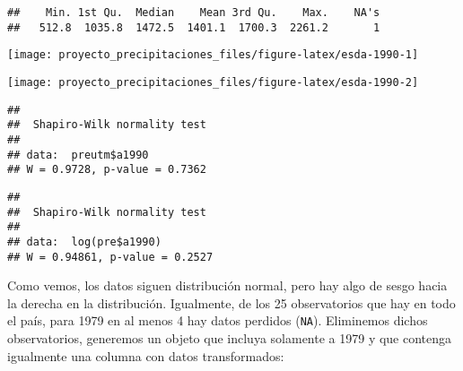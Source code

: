 \documentclass[11pt,]{article}
\newenvironment{Shaded}{\begin{snugshade}}{\end{snugshade}}
\newcommand{\KeywordTok}[1]{\textcolor[rgb]{0.13,0.29,0.53}{\textbf{#1}}}
\newcommand{\OperatorTok}[1]{\textcolor[rgb]{0.81,0.36,0.00}{\textbf{#1}}}
\newcommand{\NormalTok}[1]{#1}
\begin{document}
\begin{verbatim}
##    Min. 1st Qu.  Median    Mean 3rd Qu.    Max.    NA's 
##   512.8  1035.8  1472.5  1401.1  1700.3  2261.2       1
\end{verbatim}

\begin{Shaded}
\end{Shaded}

\texttt{[image: proyecto\_precipitaciones\_files/figure-latex/esda-1990-1]}

\begin{Shaded}
\end{Shaded}

\texttt{[image: proyecto\_precipitaciones\_files/figure-latex/esda-1990-2]}

\begin{Shaded}
\end{Shaded}

\begin{verbatim}
## 
##  Shapiro-Wilk normality test
## 
## data:  preutm$a1990
## W = 0.9728, p-value = 0.7362
\end{verbatim}

\begin{Shaded}
\end{Shaded}

\begin{verbatim}
## 
##  Shapiro-Wilk normality test
## 
## data:  log(pre$a1990)
## W = 0.94861, p-value = 0.2527
\end{verbatim}

Como vemos, los datos siguen distribución normal, pero hay algo de sesgo
hacia la derecha en la distribución. Igualmente, de los 25 observatorios
que hay en todo el país, para 1979 en al menos 4 hay datos perdidos
(\texttt{NA}). Eliminemos dichos observatorios, generemos un objeto que
incluya solamente a 1979 y que contenga igualmente una columna con datos
transformados:
\end{document}
